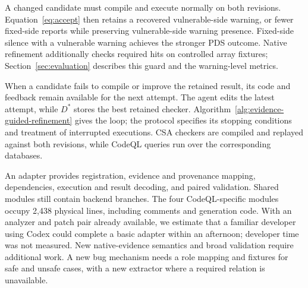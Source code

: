 A changed candidate must compile and execute normally on both revisions.
Equation~\ref{eq:accept} then retains a recovered vulnerable-side warning, or fewer fixed-side reports while preserving vulnerable-side warning presence.
Fixed-side silence with a vulnerable warning achieves the stronger PDS outcome.
Native refinement additionally checks required hits on controlled array fixtures; Section~\ref{sec:evaluation} describes this guard and the warning-level metrics.

When a candidate fails to compile or improve the retained result, its code and feedback remain available for the next attempt.
The agent edits the latest attempt, while $D^*$ stores the best retained checker.
Algorithm~\ref{alg:evidence-guided-refinement} gives the loop; the protocol specifies its stopping conditions and treatment of interrupted executions.
CSA checkers are compiled and replayed against both revisions, while CodeQL queries run over the corresponding databases.

An adapter provides registration, evidence and provenance mapping, dependencies, execution and result decoding, and paired validation.
Shared modules still contain backend branches.
The four CodeQL-specific modules occupy 2,438 physical lines, including comments and generation code.
With an analyzer and patch pair already available, we estimate that a familiar developer using Codex could complete a basic adapter within an afternoon; developer time was not measured.
New native-evidence semantics and broad validation require additional work.
A new bug mechanism needs a role mapping and fixtures for safe and unsafe cases, with a new extractor where a required relation is unavailable.

